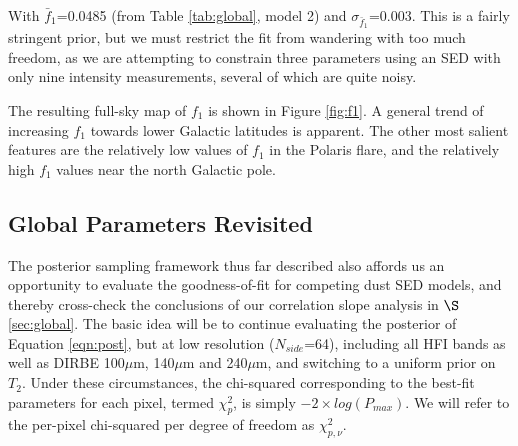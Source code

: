 \documentclass{emulateapj}
\begin{document}
With $\bar{f}_1$=0.0485 (from Table \ref{tab:global}, model 2) and 
$\sigma_{\bar{f}_1}$=0.003. This is a fairly stringent prior, but we must 
restrict the fit from wandering with too much freedom, as we are attempting to 
constrain three parameters using an SED with only nine intensity measurements, 
several of which are quite noisy.


The resulting full-sky map of $f_1$ is shown in Figure \ref{fig:f1}. A 
general trend of increasing $f_1$ towards lower Galactic latitudes is 
apparent. The other most salient features are the relatively low
values of $f_1$ in the Polaris flare, and the relatively high $f_1$ values
near the north Galactic pole.

 

\subsection{Global Parameters Revisited}
\label{sec:hier}

The posterior sampling framework thus far described also affords us an
opportunity to evaluate the goodness-of-fit for competing dust SED models, and 
thereby cross-check the conclusions of our correlation slope analysis in
$\S$\ref{sec:global}. The basic idea will be to continue evaluating the 
posterior of Equation \ref{eqn:post}, but at low resolution ($N_{side}$=64), 
including all HFI bands as well as DIRBE 100$\mu$m, 140$\mu$m and 240$\mu$m, 
and switching to a uniform prior on $T_2$. Under these circumstances, the 
chi-squared corresponding to the best-fit parameters for each pixel, termed 
$\chi^2_p$, is simply $-2 \times log(P_{max})$. We will refer to the
per-pixel chi-squared per degree of freedom as $\chi^2_{p, \nu}$.
\end{document}
